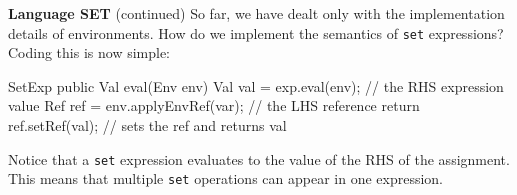 \begin{minipage}[t]{\sw}
\slidenumber
\LARGE
{\bf Language SET} (continued)\exx
{\Large
\emm{}\exx
}
So far, we have dealt only with the implementation details
of environments.  How do we implement the semantics
of \verb'set' expressions?
Coding this is now simple:
{\Large
\begin{qv}
SetExp
    public Val eval(Env env) {
        Val val = exp.eval(env); // the RHS expression value
        Ref ref = env.applyEnvRef(var); // the LHS reference
        return ref.setRef(val);  // sets the ref and returns val
    }
\end{qv}
}
Notice that a \verb'set' expression evaluates
to the value of the RHS of the assignment.
This means that multiple \verb'set' operations can appear
in one expression.
\end{minipage}
\clearpage
